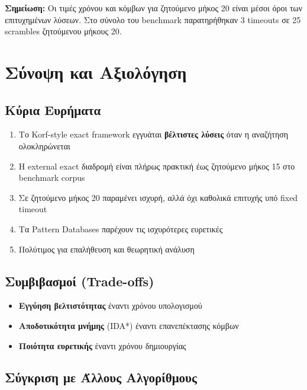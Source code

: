 \textbf{Σημείωση:} Οι τιμές χρόνου και κόμβων για ζητούμενο μήκος 20 είναι μέσοι όροι των
επιτυχημένων λύσεων. Στο σύνολο του benchmark παρατηρήθηκαν 3 timeouts σε 25
scrambles ζητούμενου μήκους 20.

\section{Σύνοψη και Αξιολόγηση}

\subsection{Κύρια Ευρήματα}

\begin{enumerate}
    \item Το Korf-style exact framework εγγυάται \textbf{βέλτιστες λύσεις} όταν η αναζήτηση ολοκληρώνεται
    \item Η external exact διαδρομή είναι πλήρως πρακτική έως ζητούμενο μήκος 15 στο benchmark corpus
    \item Σε ζητούμενο μήκος 20 παραμένει ισχυρή, αλλά όχι καθολικά επιτυχής υπό fixed timeout
    \item Τα Pattern Databases παρέχουν τις ισχυρότερες ευρετικές
    \item Πολύτιμος για επαλήθευση και θεωρητική ανάλυση
\end{enumerate}

\subsection{Συμβιβασμοί (Trade-offs)}

\begin{itemize}
    \item \textbf{Εγγύηση βελτιστότητας} έναντι χρόνου υπολογισμού
    \item \textbf{Αποδοτικότητα μνήμης} (IDA*) έναντι επανεπέκτασης κόμβων
    \item \textbf{Ποιότητα ευρετικής} έναντι χρόνου δημιουργίας
\end{itemize}

\subsection{Σύγκριση με Άλλους Αλγορίθμους}

